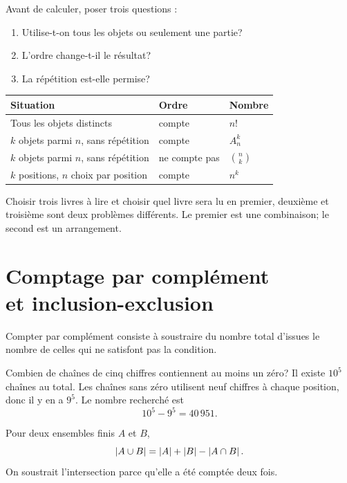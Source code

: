 \begin{methodbox}
Avant de calculer, poser trois questions :
\begin{enumerate}
\item Utilise-t-on tous les objets ou seulement une partie?
\item L'ordre change-t-il le résultat?
\item La répétition est-elle permise?
\end{enumerate}
\begin{center}
\begin{tabular}{lll}
\toprule
Situation & Ordre & Nombre \\
\midrule
Tous les objets distincts & compte & $n!$ \\
$k$ objets parmi $n$, sans répétition & compte & $A_n^k$ \\
$k$ objets parmi $n$, sans répétition & ne compte pas & $\binom nk$ \\
$k$ positions, $n$ choix par position & compte & $n^k$ \\
\bottomrule
\end{tabular}
\end{center}
\end{methodbox}

\begin{counterbox}
Choisir trois livres à lire et choisir quel livre sera lu en premier, deuxième et troisième sont deux problèmes différents. Le premier est une combinaison; le second est un arrangement.
\end{counterbox}

\section[Comptage par complément et inclusion-exclusion]{Comptage par complément\\et inclusion-exclusion}
\label{manual:section:07.06}

Compter par complément consiste à soustraire du nombre total d'issues le nombre de celles qui ne satisfont pas la condition.

\begin{examplebox}
Combien de chaînes de cinq chiffres contiennent au moins un zéro? Il existe $10^5$ chaînes au total. Les chaînes sans zéro utilisent neuf chiffres à chaque position, donc il y en a $9^5$. Le nombre recherché est
\[
10^5-9^5=40\,951.
\]
\end{examplebox}

Pour deux ensembles finis $A$ et $B$,
\[
\left\lvert A\cup B\right\rvert=\left\lvert A\right\rvert+\left\lvert B\right\rvert-\left\lvert A\cap B\right\rvert.
\]
On soustrait l'intersection parce qu'elle a été comptée deux fois.


